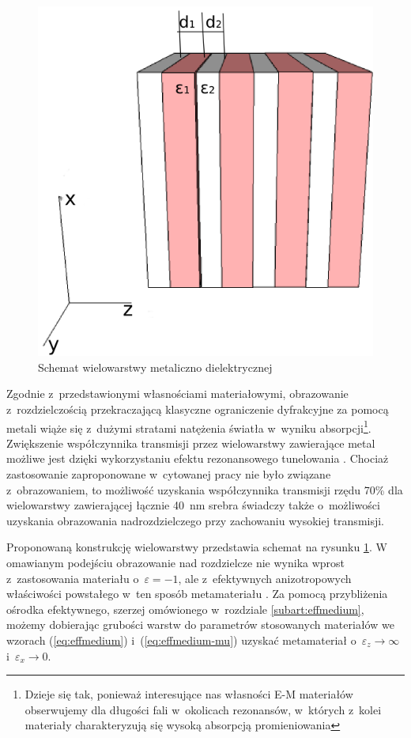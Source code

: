 \begin{figure}[tbh]
	\centering
	\includegraphics[width=.5\textwidth]{images/multilayer/multilayer-3d.png}
	\caption{Schemat wielowarstwy metaliczno dielektrycznej}
	\label{fig:mulschem}
\end{figure}


Zgodnie z~przedstawionymi własnościami materiałowymi, obrazowanie z~rozdzielczością przekraczającą klasyczne ograniczenie dyfrakcyjne za pomocą metali wiąże się z~dużymi stratami natężenia światła w~wyniku absorpcji\footnote{Dzieje się tak, ponieważ interesujące nas własności E-M materiałów obserwujemy dla długości fali w~okolicach rezonansów, w~których z~kolei materiały charakteryzują się wysoką absorpcją promieniowania}. Zwiększenie współczynnika transmisji przez wielowarstwy zawierające metal możliwe jest dzięki wykorzystaniu efektu rezonansowego tunelowania \cite{scalora-transparentmetal}. Chociaż zastosowanie zaproponowane w~cytowanej pracy nie było związane z~obrazowaniem, to możliwość uzyskania współczynnika transmisji rzędu 70\% dla wielowarstwy zawierającej łącznie 40~nm srebra świadczy także o~możliwości uzyskania obrazowania nadrozdzielczego przy zachowaniu wysokiej transmisji. 

Proponowaną konstrukcję wielowarstwy przedstawia schemat na rysunku \ref{fig:mulschem}. W omawianym podejściu obrazowanie nad rozdzielcze nie wynika wprost z~zastosowania materiału o~$\varepsilon = -1$, ale z~efektywnych anizotropowych właściwości powstałego w~ten sposób  metamateriału \cite{ramakrishna2003imaging}. Za pomocą przybliżenia ośrodka efektywnego, szerzej omówionego w~rozdziale \ref{subart:effmedium}, możemy dobierając grubości warstw do parametrów stosowanych materiałów we wzorach (\ref{eq:effmedium}) i~(\ref{eq:effmedium-mu})  uzyskać metamateriał o~$\varepsilon_z \to \infty$ i~$\varepsilon_x \to 0$.



